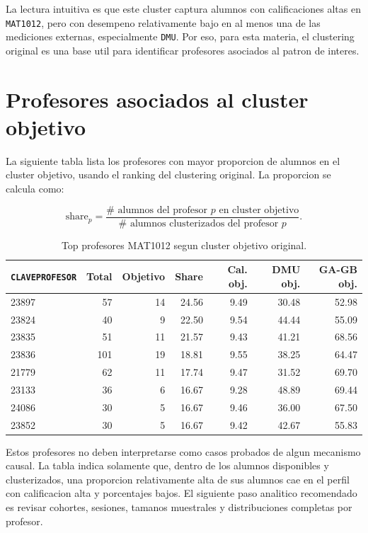 \documentclass[11pt,letterpaper]{article}
\newcommand{\code}[1]{\texttt{#1}}
\begin{document}
La lectura intuitiva es que este cluster captura alumnos con calificaciones altas en \code{MAT1012}, pero con desempeno relativamente bajo en al menos una de las mediciones externas, especialmente \code{DMU}. Por eso, para esta materia, el clustering original es una base util para identificar profesores asociados al patron de interes.

\section{Profesores asociados al cluster objetivo}

La siguiente tabla lista los profesores con mayor proporcion de alumnos en el cluster objetivo, usando el ranking del clustering original. La proporcion se calcula como:

\[
\text{share}_{p} =
\frac{\#\text{ alumnos del profesor }p\text{ en cluster objetivo}}
{\#\text{ alumnos clusterizados del profesor }p}.
\]

\begin{table}[H]
\centering
\caption{Top profesores MAT1012 segun cluster objetivo original.}
\begin{tabular}{lrrrrrr}
\toprule
\code{CLAVEPROFESOR} & Total & Objetivo & Share & Cal. obj. & DMU obj. & GA-GB obj. \\
\midrule
23897 & 57 & 14 & 24.56 & 9.49 & 30.48 & 52.98 \\
23824 & 40 & 9 & 22.50 & 9.54 & 44.44 & 55.09 \\
23835 & 51 & 11 & 21.57 & 9.43 & 41.21 & 68.56 \\
23836 & 101 & 19 & 18.81 & 9.55 & 38.25 & 64.47 \\
21779 & 62 & 11 & 17.74 & 9.47 & 31.52 & 69.70 \\
23133 & 36 & 6 & 16.67 & 9.28 & 48.89 & 69.44 \\
24086 & 30 & 5 & 16.67 & 9.46 & 36.00 & 67.50 \\
23852 & 30 & 5 & 16.67 & 9.42 & 42.67 & 55.83 \\
\bottomrule
\end{tabular}
\end{table}

Estos profesores no deben interpretarse como casos probados de algun mecanismo causal. La tabla indica solamente que, dentro de los alumnos disponibles y clusterizados, una proporcion relativamente alta de sus alumnos cae en el perfil con calificacion alta y porcentajes bajos. El siguiente paso analitico recomendado es revisar cohortes, sesiones, tamanos muestrales y distribuciones completas por profesor.
\end{document}
